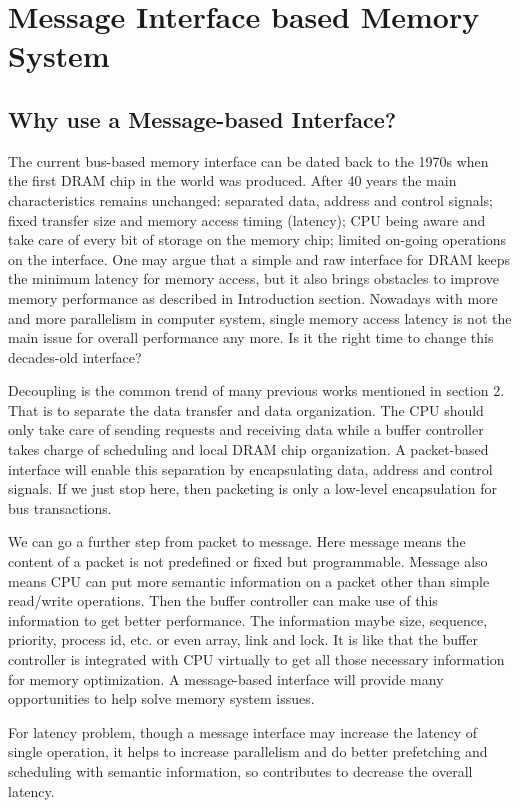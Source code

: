 \documentclass[pageno]{jpaper}
\begin{document}
\section {Message Interface based Memory System}

\subsection {Why use a Message-based Interface?}

The current bus-based memory interface can be dated back to the 1970s when the first DRAM chip in the world was produced. After 40 years the main characteristics remains unchanged: separated data, address and control signals; fixed transfer size and memory access timing (latency); CPU being aware and take care of every bit of storage on the memory chip; limited on-going operations on the interface. One may argue that a simple and raw interface for DRAM keeps the minimum latency for memory access, but it also brings obstacles to improve memory performance as described in Introduction section. Nowadays with more and more parallelism in computer system, single memory access latency is not the main issue for overall performance any more. Is it the right time to change this decades-old interface?


Decoupling is the common trend of many previous works mentioned in section 2. That is to separate the data transfer and data organization. The CPU should only take care of sending requests and receiving data while a buffer controller takes charge of scheduling and local DRAM chip organization. A packet-based interface will enable this separation by encapsulating data, address and control signals.
If we just stop here, then packeting is only a low-level encapsulation for bus transactions.


We can go a further step from packet to message. Here message means the content of a packet is not predefined or fixed but programmable. Message also means CPU can put more semantic information on a packet other than simple read/write operations. Then the buffer controller can make use of this information to get better performance. The information maybe size, sequence, priority, process id, etc. or even array, link and lock. It is like that the buffer controller is integrated with CPU virtually to get all those necessary information for memory optimization.
A message-based interface will provide many opportunities to help solve memory system issues.

For latency problem, though a message interface may increase the latency of single operation, it helps to increase parallelism and do better prefetching and scheduling with semantic information, so contributes to decrease the overall latency.
\end{document}
